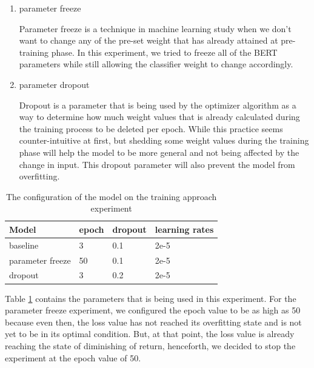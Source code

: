 \begin{enumerate}
  \item parameter freeze

        Parameter freeze is a technique in machine learning study when we don't want to change any of the pre-set weight that has already attained at pre-training phase. In this experiment, we tried to freeze all of the BERT parameters while still allowing the classifier weight to change accordingly.

  \item parameter dropout

        Dropout is a parameter that is being used by the optimizer algorithm as a way to determine how much weight values that is already calculated during the training process to be deleted per epoch. While this practice seems counter-intuitive at first, but shedding some weight values during the training phase will help the model to be more general and not being affected by the change in input. This dropout parameter will also prevent the model from overfitting.

\end{enumerate}

\begin{table}[h]
  \centering
  \caption{The configuration of the model on the training approach experiment}
  \label{tab: training_config}
  \begin{tabular}{|l|l|l|l|}
    \hline
    \textbf{Model}   & \textbf{epoch} & \textbf{dropout} & \textbf{learning rates} \\ \hline
    baseline         & 3              & 0.1              & 2e-5                    \\ \hline
    parameter freeze & 50             & 0.1              & 2e-5                    \\ \hline
    dropout          & 3              & 0.2              & 2e-5                    \\ \hline
  \end{tabular}
\end{table}

Table \ref{tab: training_config} contains the parameters that is being used in this experiment. For the parameter freeze experiment, we configured the epoch value to be as high as 50 because even then, the loss value has not reached its overfitting state and is not yet to be in its optimal condition. But, at that point, the loss value is already reaching the state of diminishing of return, henceforth, we decided to stop the experiment at the epoch value of 50.

